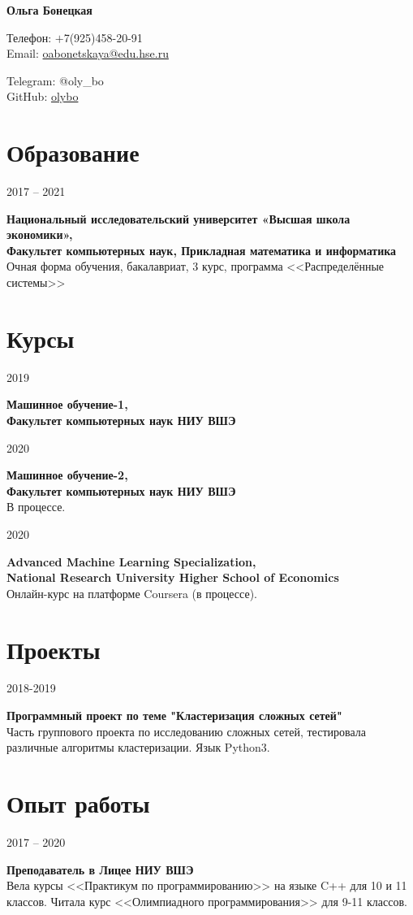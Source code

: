 \documentclass{article}
\makeatletter
\renewcommand{\maketitle}{
    \begin{center}
        \Huge
        \textbf{Ольга Бонецкая}
    \end{center}

    \footnotesize
    \begin{minipage}{0.4\textwidth}
        Телефон: $\boldsymbol{+}$7(925)458-20-91\\[0.3em]
        Email: \href{mailto:oabonetskaya@edu.hse.ru}{oabonetskaya@edu.hse.ru}
    \end{minipage}
    \hfill
    \begin{minipage}{0.4\textwidth}
        \begin{flushright}
            Telegram: {@oly\_bo}\\[0.3em]
            GitHub: \href{https://github.com/olybo}{olybo}
        \end{flushright}
    \end{minipage}
}
\newcommand{\entry}[3]{
    \begin{minipage}[t]{.11\linewidth}
        \hfill \textsc{#1}
    \end{minipage}
    \hfill\vline\hfill
    \begin{minipage}[t]{.80\linewidth}
        \textbf{#2}\\
        \footnotesize{#3}
    \end{minipage}
}
\makeatother
\begin{document}
    \maketitle

    \section{Образование}
        \entry {2017 -- 2021}
        {Национальный исследовательский университет «Высшая школа экономики»,\\
         Факультет компьютерных наук, Прикладная математика и информатика}
        {Очная форма обучения, бакалавриат, 3 курс, программа <<Распределённые системы>>}


    \section{Курсы}
        \entry {2019}
        {Машинное обучение-1,\\Факультет компьютерных наук НИУ ВШЭ}
        {}
        
        \vspace{.2cm}
        \entry {2020}
        {Машинное обучение-2,\\Факультет компьютерных наук НИУ ВШЭ}
        {В процессе.}
        
        \vspace{.2cm}
        \entry {2020}
        {Advanced Machine Learning Specialization,\\National Research University Higher School of Economics}
        {Онлайн-курс на платформе Coursera (в процессе).}
        
        \section{Проекты}
        \entry {2018-2019}
        {Программный проект по теме "Кластеризация сложных сетей"}
        {Часть группового проекта по исследованию сложных сетей, тестировала различные алгоритмы кластеризации. Язык Python3.}
        
        

    \section{Опыт работы}
    \entry {2017 -- 2020} 
    {Преподаватель в Лицее НИУ ВШЭ}
    {Вела курсы <<Практикум по программированию>> на языке C++ для 10 и 11 классов. Читала курс <<Олимпиадного программирования>> для 9-11 классов.}
\end{document}
